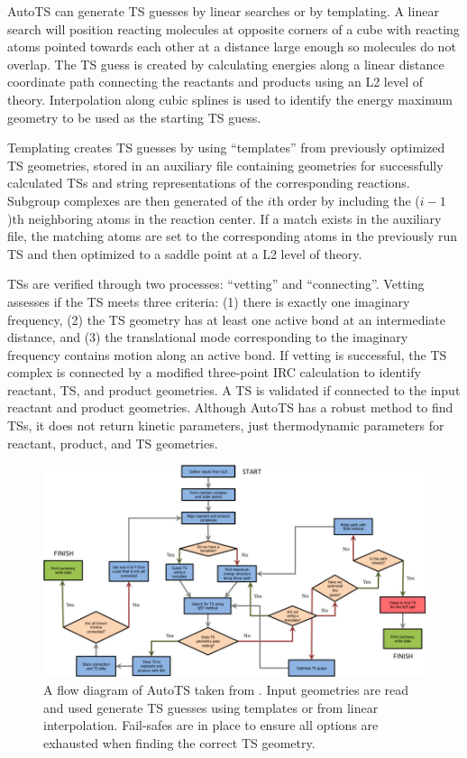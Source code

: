 \documentclass[preprint, 11pt]{elsarticle} %
\begin{document}
AutoTS can generate TS guesses by linear searches or by templating. 
A linear search will position reacting molecules at opposite corners of a cube with reacting atoms pointed towards each other at a distance large enough so molecules do not overlap.
The TS guess is created by calculating energies along a linear distance coordinate path connecting the reactants and products using an L2 level of theory.
Interpolation along cubic splines is used to identify the energy maximum geometry to be used as the starting TS guess.

Templating creates TS guesses by using ``templates''  from previously optimized TS geometries, stored in an auxiliary file containing geometries for successfully calculated TSs and string representations of the corresponding reactions.
Subgroup complexes are then generated of the $i$th order by including the ($i-1$)th neighboring atoms in the reaction center. 
If a match exists in the auxiliary file, the matching atoms are set to the corresponding atoms in the previously run TS and then optimized to a saddle point at a L2 level of theory.

TSs are verified through two processes: ``vetting'' and ``connecting''. 
Vetting assesses if the TS meets three criteria: (1) there is exactly one imaginary frequency, (2) the TS geometry has at least one active bond at an intermediate distance, and (3) the translational mode corresponding to the imaginary frequency contains motion along an active bond.
If vetting is successful, the TS complex is connected by a modified three-point IRC calculation to identify reactant, TS, and product geometries. 
A TS is validated if connected to the input reactant and product geometries.
Although AutoTS has a robust method to find TSs, it does not return kinetic parameters, just thermodynamic parameters for reactant, product, and TS geometries.

\begin{figure}[htbp]
\centering
\includegraphics[width=\textwidth]{autots_workflow}
\caption{A flow diagram of AutoTS taken from \cite{jacobson:2017}. Input geometries are read and used generate TS guesses using templates or from linear interpolation. Fail-safes are in place to ensure all options are exhausted when finding the correct TS geometry.}
\label{fig:autots_workflow}
\end{figure}
\end{document}
